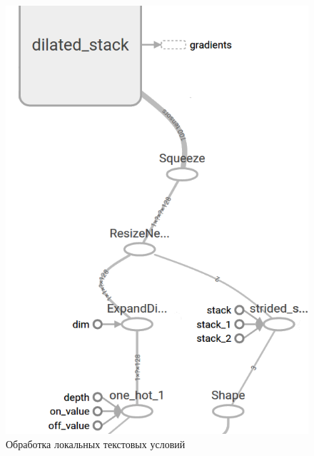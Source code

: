 \documentclass[../diploma.tex]{subfiles}
\begin{document}
\begin{figure}[ht!]
  \centering
  \includegraphics[scale=1]{img/arch}
  \caption{Обработка локальных текстовых условий}
  \label{fig:arch_low}
\end{figure}



\newpage
\pagebreak


\end{document}
